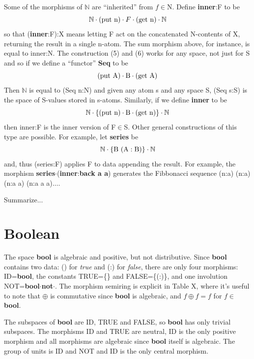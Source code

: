\documentclass[11pt]{article}
\begin{document}
Some of the morphisms of ${\mathbb N}$ are ``inherited'' from $f\in$N.  Define {\bf inner}:F to be 
\begin{equation}
{\mathbb N}\cdot({\rm put\ n})\cdot F\cdot({\rm get\ n})\cdot{\mathbb N}
\end{equation}
so that ({\bf inner}:F):X means letting F act on the concatenated N-contents of X, returning the result in a single n-atom.  The sum morphism 
above, for instance, is equal to inner:N.  The construction (5) and (6) works for any space, not just for S and so if we define a ``functor'' {\bf Seq} 
to be 
\begin{equation}
({\rm put}\ {\rm A})\cdot {\rm B} \cdot ({\rm get}\ {\rm A})
\end{equation}
Then {$\mathbb N$} is equal to (Seq n:N) and given any atom s and any space S, (Seq s:S) is the space of S-values stored in s-atoms.  
Similarly, if we define {\bf inner} to be  
\begin{equation}
{\mathbb N}\cdot\{({\rm put\ n})\cdot{\rm B}\cdot({\rm get\ n})\}\cdot{\mathbb N}
\end{equation}
then inner:F is the inner version of F$\in$S.  Other general constructions of this type are possible.  For example, let {\bf series} be 
\begin{equation}
{\mathbb N}\cdot\{{\rm B\ (A:B)}\}\cdot{\mathbb N} 
\end{equation}
and, thus (series:F) applies F to data appending the result.  For example, the morphism {\bf series}$\cdot$({\bf inner}:{\bf back a a}) 
generates the Fibbonacci sequence (n:a) (n:a) (n:a a) (n:a a a)$\dots$.

Summarize...

\section{Boolean} 

      The space {\bf bool} is algebraic and positive, but not distributive.  Since {\bf bool} contains two data:  () for {\it true} and (:) for {\it false},   
 there are only four morphisms:  ID={\bf bool},  the constants TRUE=\{\} and FALSE=\{(:)\}, and one involution 
 NOT={\bf bool}$\cdot${\bf not}$\cdot$.  The morphism semiring is explicit in Table X, where it's useful to note that $\oplus$ is commutative since {\bf bool} is 
 algebraic, and $f\oplus f=f$ for $f\in${\bf bool}.  

The subspaces of {\bf bool} are ID, TRUE and FALSE, so {\bf bool} has only trivial subspaces.  The morphisms ID and TRUE are neutral, ID is the only positive 
morphism and all morphisms are algebraic since {\bf bool} itself is algebraic.  The group of units is ID and NOT and ID is the only central morphism. 
\end{document}
